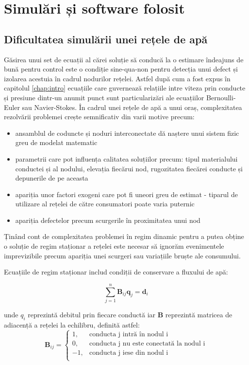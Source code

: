 \chapter{Simulări și software folosit}
\label{chap:simulari}

\section{Dificultatea simulării unei rețele de apă}

Găsirea unui set de ecuații al cărei soluție să conducă la o estimare îndeajuns de bună pentru control este o condiție sine-qua-non pentru detecția unui defect și izolarea acestuia în cadrul nodurilor rețelei. Astfel după cum a fost expus în capitolul \ref{chap:intro} ecuațiile care guvernează relațiile intre viteza prin conducte și presiune dintr-un anumit punct sunt particularizări ale ecuațiilor Bernoulli-Euler sau Navier-Stokes. În cadrul unei rețele de apă a unui oraș, complexitatea rezolvării problemei crește semnificativ din varii motive precum:
\begin{itemize}
\item ansamblul de coduncte și noduri interconectate dă naștere unui sistem fizic greu de modelat matematic
\item parametrii care pot influența calitatea soluțiilor precum: tipul materialului conductei și al nodului, elevația fiecărui nod, rugozitatea fiecărei conducte și depunerile de pe aceasta
\item apariția unor factori exogeni care pot fi uneori greu de estimat - tiparul de utilizare al rețelei de către consumatori poate varia puternic
\item apariția defectelor precum scurgerile în proximitatea unui nod
\end{itemize}

Ținând cont de complexitatea problemei în regim dinamic pentru a putea obține o soluție de regim staționar a rețelei este necesar să ignorăm evenimentele imprevizibile precum apariția unei scurgeri sau variațiile bruște ale consumului.

Ecuațiile de regim staționar includ condiții de conservare a fluxului de apă:

\begin{equation}
\label{Ecuația de conservare a rețelei de apă}
\sum\limits_{j=1}^{n} \mathbf B_{ij}\mathbf q_j=\mathbf d_i
\end{equation}

unde $q_i$ reprezintă debitul prin fiecare conductă iar \textbf{B} reprezintă matricea de adiacență a rețelei la echilibru, definită astfel:
\begin{equation}
\textbf{B}_{ij} = 
     \begin{cases}
       1, & \text{conducta j intră în nodul i}\\
       0, & \text{conducta j nu este conectată la nodul i} \\
       -1, & \text{conducta j iese din nodul i}\\ 
     \end{cases}
\end{equation}


